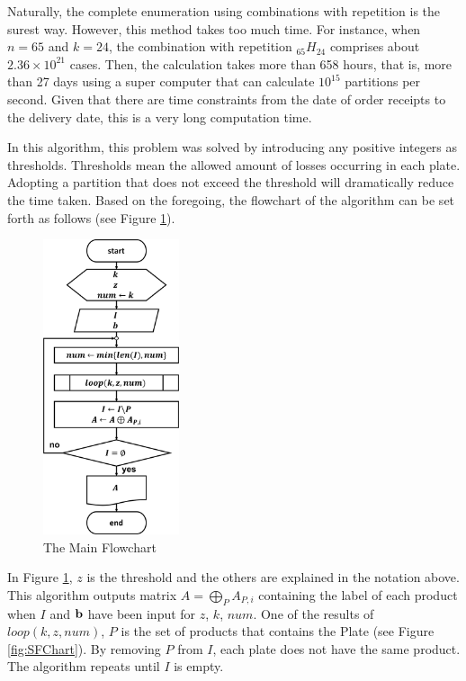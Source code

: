 \documentclass[a4paper]{amsart}
\numberwithin{equation}{section} %
\numberwithin{figure}{section} %
\numberwithin{table}{section}
\theoremstyle{plain}
\theoremstyle{definition}
\theoremstyle{plain}
\theoremstyle{plain}
\theoremstyle{plain}
\theoremstyle{plain}
\theoremstyle{plain}
\begin{document}
Naturally, the complete enumeration using combinations with repetition is the surest way. 
However, this method takes too much time. 
For instance, when $n=65$ and $k = 24$, the combination with repetition $_{65}H_{24}$ comprises about $2.36 \times 10^{21}$ cases.
Then, the calculation takes more than 658 hours, that is, more than 27 days using a super computer that can calculate $10^{15}$ partitions per second. 
Given that there are time constraints from the date of order receipts to the delivery date, this is a very long computation time.

In this algorithm, this problem was solved by introducing any positive integers as thresholds. 
Thresholds mean the allowed amount of losses occurring in each plate. 
Adopting a partition that does not exceed the threshold will dramatically reduce the time taken.
Based on the foregoing, the flowchart of the algorithm can be set forth as follows (see Figure \ref{fig:MFChart}).

\begin{figure}[h!]
	\centering
	\includegraphics[width=4cm]{MainFChart.pdf}
	\caption{The Main Flowchart}
	\label{fig:MFChart}       %
\end{figure}

In Figure \ref{fig:MFChart}, $z$ is the threshold and the others are explained in the notation above.
This algorithm outputs matrix $A=\bigoplus\limits_{P} A_{P,i}$ containing the label of each product when $I$ and ${\bf b}$ have been input for $z$, $k$, $num$. 
One of the results of ${loop}(k, z, num)$, $P$ is the set of products that contains the Plate (see Figure \ref{fig:SFChart}). 
By removing $P$ from $I$, each plate does not have the same product.
The algorithm repeats until $I$ is empty.
\end{document}
